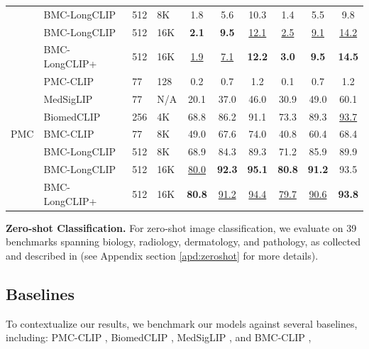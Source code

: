 \begin{table}[t]
\begin{tabular}{l l l l
*{3}{S[table-format=2.1, table-number-alignment=center]}
*{3}{S[table-format=2.1, table-number-alignment=center]}}
 & BMC-LongCLIP    & 512 & 8K & 1.8 & 5.6 & 10.3  & 1.4 & 5.5 & 9.8 \\
 & BMC-LongCLIP  & 512 & 16K & \textbf{2.1} & \textbf{9.5} & \underline{12.1} & \underline{2.5} & \underline{9.1} & \underline{14.2} \\
 & BMC-LongCLIP+  & 512 & 16K & \underline{1.9} & \underline{7.1} & \textbf{12.2} & \textbf{3.0} & \textbf{9.5} & \textbf{14.5} \\
\cmidrule(lr){2-10}
 & PMC-CLIP            & 77 & 128 & 0.2 & 0.7 & 1.2 & 0.1 & 0.7 & 1.2 \\
 & MedSigLIP           & 77 & N/A & 20.1 & 37.0 & 46.0 & 30.9 & 49.0 & 60.1 \\
 & BiomedCLIP          & 256 & 4K & 68.8 & 86.2 & 91.1 & 73.3 & 89.3 & \underline{93.7} \\
PMC & BMC-CLIP    & 77 & 8K & {49.0} & {67.6} & {74.0} & {40.8} & {60.4} & {68.4} \\
 & BMC-LongCLIP    & 512 & 8K & 68.9 & 84.3 & 89.3  & 71.2 & 85.9 & 89.9 \\
 & BMC-LongCLIP   & 512 & 16K & \underline{80.0} & \textbf{92.3} & \textbf{95.1} & \textbf{80.8} & \textbf{91.2} & 93.5 \\
 & BMC-LongCLIP+  & 512 & 16K & \textbf{80.8} & \underline{91.2} & \underline{94.4} & \underline{79.7} & \underline{90.6} & \textbf{93.8} \\
\bottomrule
\end{tabular}
\end{table}






\noindent \textbf{Zero-shot Classification.}  
For zero-shot image classification, we evaluate on 39 benchmarks spanning biology, radiology, dermatology, and pathology, as collected and described in \cite{biomedica} (see Appendix section \ref{apd:zeroshot} for more details).


\subsection{Baselines} 
To contextualize our results, we benchmark our models  against several  baselines, including: PMC-CLIP    \cite{eslami2023pubmedclip}, BiomedCLIP \cite{zhang2023biomedclip}, MedSigLIP \cite{sellergren2025medgemma}, and BMC-CLIP  \cite{lozano2025biomedica}, 

